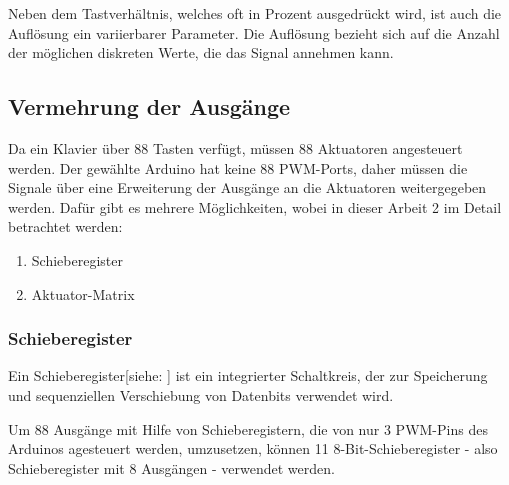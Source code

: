 Neben dem Tastverhältnis, welches oft in Prozent ausgedrückt wird, ist auch die Auflösung ein variierbarer Parameter.
Die Auflösung bezieht sich auf die Anzahl der möglichen diskreten Werte, die das Signal annehmen kann.


\subsection{Vermehrung der Ausgänge}\label{output}

Da ein Klavier über 88 Tasten verfügt, müssen 88 Aktuatoren angesteuert werden. Der gewählte Arduino hat keine 88 \ac{PWM}-Ports, daher
müssen die Signale über eine Erweiterung der Ausgänge an die Aktuatoren weitergegeben werden. Dafür gibt es mehrere Möglichkeiten,
wobei in dieser Arbeit 2 im Detail betrachtet werden:

\begin{enumerate}
	\item Schieberegister
	\item Aktuator-Matrix
\end{enumerate}

\subsubsection{Schieberegister}
Ein Schieberegister[siehe: \cite*[siehe ][]{Schieberegister}] ist ein integrierter Schaltkreis, der zur Speicherung und sequenziellen Verschiebung von
Datenbits verwendet wird.\newline

Um 88 Ausgänge mit Hilfe von Schieberegistern, die von nur 3 \ac{PWM}-Pins des Arduinos agesteuert werden, umzusetzen,
können 11 8-Bit-Schieberegister  - also Schieberegister mit 8 Ausgängen - verwendet werden.

